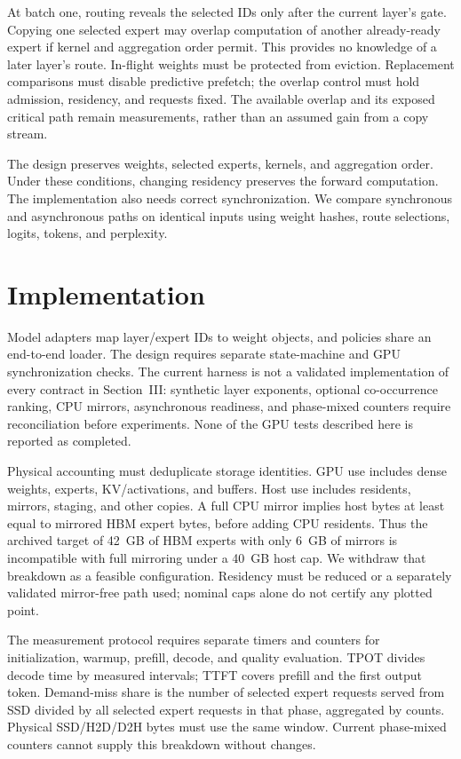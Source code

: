 \documentclass[conference,9pt,letterpaper]{IEEEtran}
\begin{document}
At batch one, routing reveals the selected IDs only after the current layer's gate. Copying one selected expert may overlap computation of another already-ready expert if kernel and aggregation order permit. This provides no knowledge of a later layer's route. In-flight weights must be protected from eviction. Replacement comparisons must disable predictive prefetch; the overlap control must hold admission, residency, and requests fixed. The available overlap and its exposed critical path remain measurements, rather than an assumed gain from a copy stream.

The design preserves weights, selected experts, kernels, and aggregation order. Under these conditions, changing residency preserves the forward computation. The implementation also needs correct synchronization. We compare synchronous and asynchronous paths on identical inputs using weight hashes, route selections, logits, tokens, and perplexity.

\section{Implementation}
Model adapters map layer/expert IDs to weight objects, and policies share an end-to-end loader. The design requires separate state-machine and GPU synchronization checks. The current harness is not a validated implementation of every contract in Section~III: synthetic layer exponents, optional co-occurrence ranking, CPU mirrors, asynchronous readiness, and phase-mixed counters require reconciliation before experiments. None of the GPU tests described here is reported as completed.

Physical accounting must deduplicate storage identities. GPU use includes dense weights, experts, KV/activations, and buffers. Host use includes residents, mirrors, staging, and other copies. A full CPU mirror implies host bytes at least equal to mirrored HBM expert bytes, before adding CPU residents. Thus the archived target of 42~GB of HBM experts with only 6~GB of mirrors is incompatible with full mirroring under a 40~GB host cap. We withdraw that breakdown as a feasible configuration. Residency must be reduced or a separately validated mirror-free path used; nominal caps alone do not certify any plotted point.

The measurement protocol requires separate timers and counters for initialization, warmup, prefill, decode, and quality evaluation. TPOT divides decode time by measured intervals; TTFT covers prefill and the first output token. Demand-miss share is the number of selected expert requests served from SSD divided by all selected expert requests in that phase, aggregated by counts. Physical SSD/H2D/D2H bytes must use the same window. Current phase-mixed counters cannot supply this breakdown without changes.
\end{document}
